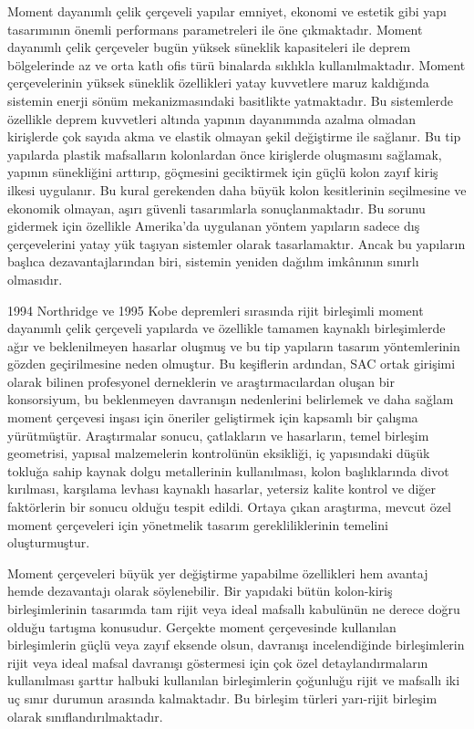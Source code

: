 Moment dayanımlı çelik çerçeveli yapılar emniyet, ekonomi ve estetik
gibi yapı tasarımının önemli performans parametreleri ile öne çıkmaktadır.
Moment dayanımlı çelik çerçeveler bugün yüksek süneklik kapasiteleri
ile deprem bölgelerinde az ve orta katlı ofis türü binalarda sıklıkla
kullanılmaktadır. Moment çerçevelerinin yüksek süneklik özellikleri
yatay kuvvetlere maruz kaldığında sistemin enerji sönüm mekanizmasındaki
basitlikte yatmaktadır. Bu sistemlerde özellikle deprem kuvvetleri
altında yapının dayanımında azalma olmadan kirişlerde çok sayıda akma
ve elastik olmayan şekil değiştirme ile sağlanır. Bu tip yapılarda
plastik mafsalların kolonlardan önce kirişlerde oluşmasını sağlamak,
yapının sünekliğini arttırıp, göçmesini geciktirmek için güçlü kolon
zayıf kiriş ilkesi uygulanır. Bu kural gerekenden daha büyük kolon
kesitlerinin seçilmesine ve ekonomik olmayan, aşırı güvenli tasarımlarla
sonuçlanmaktadır. Bu sorunu gidermek için özellikle Amerika’da uygulanan
yöntem yapıların sadece dış çerçevelerini yatay yük taşıyan sistemler
olarak tasarlamaktır. Ancak bu yapıların başlıca dezavantajlarından
biri, sistemin yeniden dağılım imkânının sınırlı olmasıdır. 

1994 Northridge ve 1995 Kobe depremleri sırasında rijit birleşimli
moment dayanımlı çelik çerçeveli yapılarda ve özellikle tamamen kaynaklı
birleşimlerde ağır ve beklenilmeyen hasarlar oluşmuş ve bu tip yapıların
tasarım yöntemlerinin gözden geçirilmesine neden olmuştur. Bu keşiflerin
ardından, SAC ortak girişimi olarak bilinen profesyonel derneklerin
ve araştırmacılardan oluşan bir konsorsiyum, bu beklenmeyen davranışın
nedenlerini belirlemek ve daha sağlam moment çerçevesi inşası için
öneriler geliştirmek için kapsamlı bir çalışma yürütmüştür. Araştırmalar
sonucu, çatlakların ve hasarların, temel birleşim geometrisi, yapısal
malzemelerin kontrolünün eksikliği, iç yapısındaki düşük tokluğa sahip
kaynak dolgu metallerinin kullanılması, kolon başlıklarında divot
kırılması, karşılama levhası kaynaklı hasarlar, yetersiz kalite kontrol
ve diğer faktörlerin bir sonucu olduğu tespit edildi. Ortaya çıkan
araştırma, mevcut özel moment çerçeveleri için yönetmelik tasarım
gerekliliklerinin temelini oluşturmuştur.

Moment çerçeveleri büyük yer değiştirme yapabilme özellikleri hem
avantaj hemde dezavantajı olarak söylenebilir. Bir yapıdaki bütün
kolon-kiriş birleşimlerinin tasarımda tam rijit veya ideal mafsallı
kabulünün ne derece doğru olduğu tartışma konusudur. Gerçekte moment
çerçevesinde kullanılan birleşimlerin güçlü veya zayıf eksende olsun,
davranışı incelendiğinde birleşimlerin rijit veya ideal mafsal davranışı
göstermesi için çok özel detaylandırmaların kullanılması şarttır halbuki
kullanılan birleşimlerin çoğunluğu rijit ve mafsallı iki uç sınır
durumun arasında kalmaktadır. Bu birleşim türleri yarı-rijit birleşim
olarak sınıflandırılmaktadır. 

